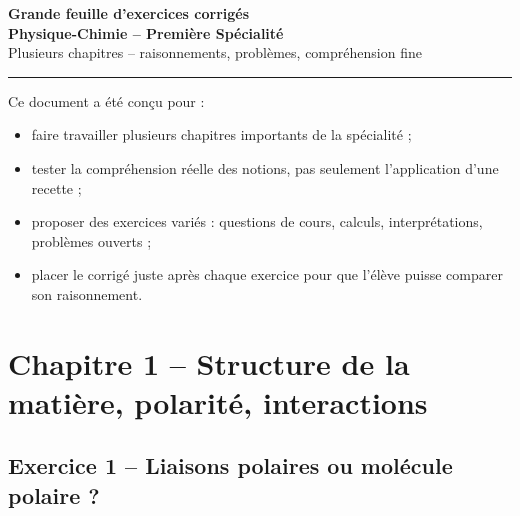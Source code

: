 \documentclass[11pt,a4paper]{article}
\begin{document}
\begin{center}
    {\LARGE \textbf{Grande feuille d'exercices corrigés}}\\[0.2em]
    {\Large \textbf{Physique-Chimie -- Première Spécialité}}\\[0.2em]
    {\normalsize Plusieurs chapitres -- raisonnements, problèmes, compréhension fine}\\[0.6em]
    \rule{0.9\linewidth}{0.6pt}
\end{center}

\begin{objectifbox}
Ce document a été conçu pour :
\begin{itemize}
    \item faire travailler plusieurs chapitres importants de la spécialité ;
    \item tester la compréhension réelle des notions, pas seulement l'application d'une recette ;
    \item proposer des exercices variés : questions de cours, calculs, interprétations, problèmes ouverts ;
    \item placer le corrigé juste après chaque exercice pour que l'élève puisse comparer son raisonnement.
\end{itemize}
\end{objectifbox}

\tableofcontents
\vspace{1em}

\section{Chapitre 1 -- Structure de la matière, polarité, interactions}

\subsection{Exercice 1 -- Liaisons polaires ou molécule polaire ?}
\end{document}
